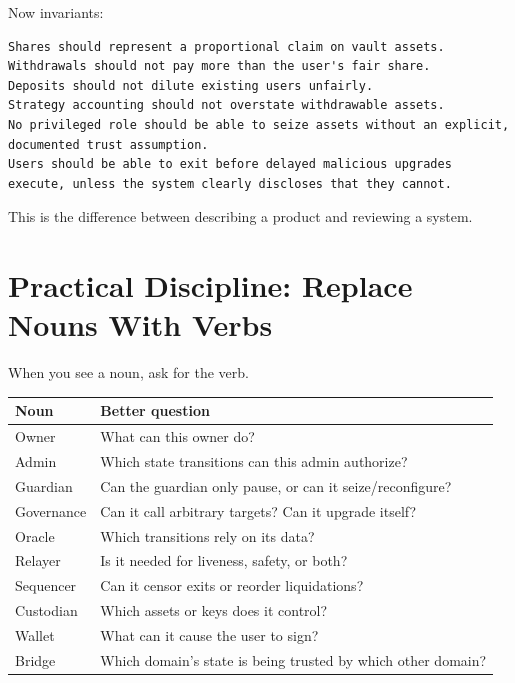 Now invariants:

\begin{lstlisting}
Shares should represent a proportional claim on vault assets.
Withdrawals should not pay more than the user's fair share.
Deposits should not dilute existing users unfairly.
Strategy accounting should not overstate withdrawable assets.
No privileged role should be able to seize assets without an explicit, documented trust assumption.
Users should be able to exit before delayed malicious upgrades execute, unless the system clearly discloses that they cannot.
\end{lstlisting}

This is the difference between describing a product and reviewing a
system.

\section{Practical Discipline: Replace Nouns With Verbs}

When you see a noun, ask for the verb.

{\def\LTcaptype{none} %
\begin{longtable}[]{@{}
  >{\raggedright\arraybackslash}p{}
  >{\raggedright\arraybackslash}p{}@{}}
\toprule\noalign{}
\begin{minipage}[b]{\linewidth}\raggedright
Noun
\end{minipage} & \begin{minipage}[b]{\linewidth}\raggedright
Better question
\end{minipage} \\
\midrule\noalign{}
\endhead
\bottomrule\noalign{}
\endlastfoot
Owner & What can this owner do? \\
Admin & Which state transitions can this admin authorize? \\
Guardian & Can the guardian only pause, or can it seize/reconfigure? \\
Governance & Can it call arbitrary targets? Can it upgrade itself? \\
Oracle & Which transitions rely on its data? \\
Relayer & Is it needed for liveness, safety, or both? \\
Sequencer & Can it censor exits or reorder liquidations? \\
Custodian & Which assets or keys does it control? \\
Wallet & What can it cause the user to sign? \\
Bridge & Which domain's state is being trusted by which other domain? \\
\end{longtable}
}

